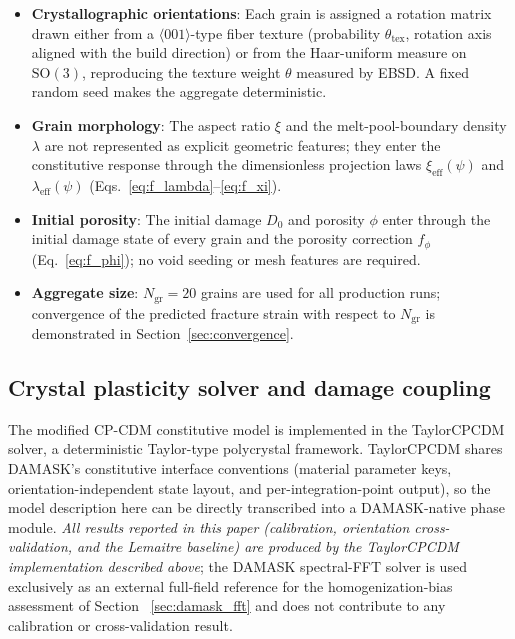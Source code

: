 \documentclass[12pt,a4paper,twocolumn]{article}
\begin{document}
\begin{itemize}
    \item \textbf{Crystallographic orientations}: Each grain is assigned a rotation matrix drawn either from a $\langle001\rangle$-type fiber texture (probability $\theta_{\text{tex}}$, rotation axis aligned with the build direction) or from the Haar-uniform measure on $\mathrm{SO}(3)$, reproducing the texture weight $\theta$ measured by EBSD. A fixed random seed makes the aggregate deterministic.
    \item \textbf{Grain morphology}: The aspect ratio $\xi$ and the melt-pool-boundary density $\lambda$ are not represented as explicit geometric features; they enter the constitutive response through the dimensionless projection laws $\xi_{\text{eff}}(\psi)$ and $\lambda_{\text{eff}}(\psi)$ (Eqs.~\eqref{eq:f_lambda}--\eqref{eq:f_xi}).
    \item \textbf{Initial porosity}: The initial damage $D_0$ and porosity $\phi$ enter through the initial damage state of every grain and the porosity correction $f_\phi$ (Eq.~\eqref{eq:f_phi}); no void seeding or mesh features are required.
    \item \textbf{Aggregate size}: $N_{\text{gr}} = 20$ grains are used for all production runs; convergence of the predicted fracture strain with respect to $N_{\text{gr}}$ is demonstrated in Section~\ref{sec:convergence}.
\end{itemize}

\subsection{Crystal plasticity solver and damage coupling}

The modified CP-CDM constitutive model is implemented in the TaylorCPCDM solver, a deterministic Taylor-type polycrystal framework. TaylorCPCDM shares DAMASK's constitutive interface conventions (material parameter keys, orientation-independent state layout, and per-integration-point output), so the model description here can be directly transcribed into a DAMASK-native phase module. \emph{All results reported in this paper (calibration, orientation cross-validation, and the Lemaitre baseline) are produced by the TaylorCPCDM implementation described above}; the DAMASK spectral-FFT solver is used exclusively as an external full-field reference for the homogenization-bias assessment of Section~
\ref{sec:damask_fft} and does not contribute to any calibration or cross-validation result.
\end{document}
